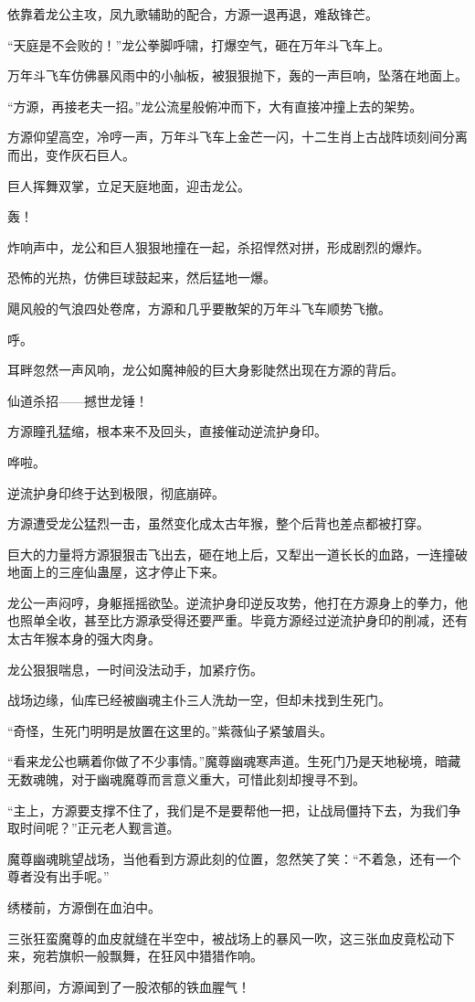 \begin{this_body}
依靠着龙公主攻，凤九歌辅助的配合，方源一退再退，难敌锋芒。

“天庭是不会败的！”龙公拳脚呼啸，打爆空气，砸在万年斗飞车上。

万年斗飞车仿佛暴风雨中的小舢板，被狠狠抛下，轰的一声巨响，坠落在地面上。

“方源，再接老夫一招。”龙公流星般俯冲而下，大有直接冲撞上去的架势。

方源仰望高空，冷哼一声，万年斗飞车上金芒一闪，十二生肖上古战阵顷刻间分离而出，变作灰石巨人。

巨人挥舞双掌，立足天庭地面，迎击龙公。

轰！

炸响声中，龙公和巨人狠狠地撞在一起，杀招悍然对拼，形成剧烈的爆炸。

恐怖的光热，仿佛巨球鼓起来，然后猛地一爆。

飓风般的气浪四处卷席，方源和几乎要散架的万年斗飞车顺势飞撤。

呼。

耳畔忽然一声风响，龙公如魔神般的巨大身影陡然出现在方源的背后。

仙道杀招——撼世龙锤！

方源瞳孔猛缩，根本来不及回头，直接催动逆流护身印。

哗啦。

逆流护身印终于达到极限，彻底崩碎。

方源遭受龙公猛烈一击，虽然变化成太古年猴，整个后背也差点都被打穿。

巨大的力量将方源狠狠击飞出去，砸在地上后，又犁出一道长长的血路，一连撞破地面上的三座仙蛊屋，这才停止下来。

龙公一声闷哼，身躯摇摇欲坠。逆流护身印逆反攻势，他打在方源身上的拳力，他也照单全收，甚至比方源承受得还要严重。毕竟方源经过逆流护身印的削减，还有太古年猴本身的强大肉身。

龙公狠狠喘息，一时间没法动手，加紧疗伤。

战场边缘，仙库已经被幽魂主仆三人洗劫一空，但却未找到生死门。

“奇怪，生死门明明是放置在这里的。”紫薇仙子紧皱眉头。

“看来龙公也瞒着你做了不少事情。”魔尊幽魂寒声道。生死门乃是天地秘境，暗藏无数魂魄，对于幽魂魔尊而言意义重大，可惜此刻却搜寻不到。

“主上，方源要支撑不住了，我们是不是要帮他一把，让战局僵持下去，为我们争取时间呢？”正元老人觐言道。

魔尊幽魂眺望战场，当他看到方源此刻的位置，忽然笑了笑：“不着急，还有一个尊者没有出手呢。”

绣楼前，方源倒在血泊中。

三张狂蛮魔尊的血皮就缝在半空中，被战场上的暴风一吹，这三张血皮竟松动下来，宛若旗帜一般飘舞，在狂风中猎猎作响。

刹那间，方源闻到了一股浓郁的铁血腥气！

\end{this_body}

